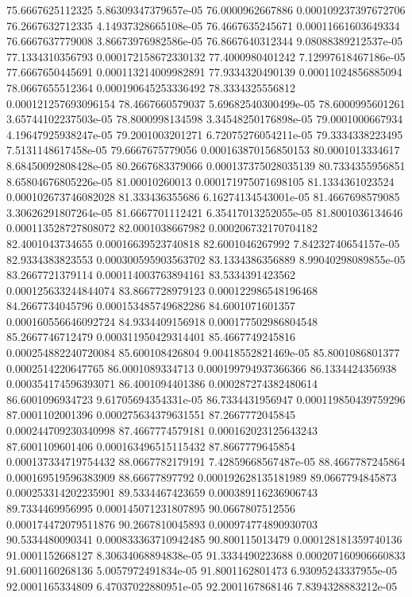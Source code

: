 {75.6667625112325 5.86309347379657e-05
76.0000962667886 0.000109237397672706
76.2667632712335 4.14937328665108e-05
76.4667635245671 0.00011661603649334
76.6667637779008 3.86673976982586e-05
76.8667640312344 9.08088389212537e-05
77.1334310356793 0.000172158672330132
77.4000980401242 7.12997618467186e-05
77.6667650445691 0.000113214009982891
77.9334320490139 0.00011024856885094
78.0667655512364 0.000190645253336492
78.3334325556812 0.000121257693096154
78.4667660579037 5.69682540300499e-05
78.6000995601261 3.65744102237503e-05
78.8000998134598 3.34548250176898e-05
79.0001000667934 4.19647925938247e-05
79.2001003201271 6.72075276054211e-05
79.3334338223495 7.5131148617458e-05
79.6667675779056 0.000163870156850153
80.0001013334617 8.68450092808428e-05
80.2667683379066 0.000137375028035139
80.7334355956851 8.65804676805226e-05
81.00010260013 0.000171975071698105
81.1334361023524 0.000102673746082028
81.333436355686 6.16274134543001e-05
81.4667698579085 3.30626291807264e-05
81.6667701112421 6.35417013252055e-05
81.8001036134646 0.000113528727808072
82.0001038667982 0.000206732170704182
82.4001043734655 0.00016639523740818
82.6001046267992 7.84232740654157e-05
82.9334383823553 0.000300595903563702
83.1334386356889 8.99040298089855e-05
83.2667721379114 0.000114003763894161
83.5334391423562 0.000125633244844074
83.8667728979123 0.000122986548196468
84.2667734045796 0.000153485749682286
84.6001071601357 0.000160556646092724
84.9334409156918 0.000177502986804548
85.2667746712479 0.000311950429314401
85.4667749245816 0.000254882240720084
85.600108426804 9.00418552821469e-05
85.8001086801377 0.0002514220647765
86.0001089334713 0.000199794937366366
86.1334424356938 0.000354174596393071
86.4001094401386 0.000287274382480614
86.6001096934723 9.61705694354331e-05
86.7334431956947 0.000119850439759296
87.0001102001396 0.000275634379631551
87.2667772045845 0.000244709230340998
87.4667774579181 0.000162023125643243
87.6001109601406 0.000163496515115432
87.8667779645854 0.000137334719754432
88.0667782179191 7.42859668567487e-05
88.4667787245864 0.000169519596383909
88.66677897792 0.000192628135181989
89.0667794845873 0.000253314202235901
89.5334467423659 0.000389116236906743
89.7334469956995 0.000145071231807895
90.0667807512556 0.000174472079511876
90.2667810045893 0.000974774890930703
90.5334480090341 0.000833363710942485
90.800115013479 0.000128181359740136
91.0001152668127 8.30634068894838e-05
91.3334490223688 0.000207160906660833
91.6001160268136 5.0057972491834e-05
91.8001162801473 6.93095243337955e-05
92.0001165334809 6.47037022880951e-05
92.2001167868146 7.8394328883212e-05
}
